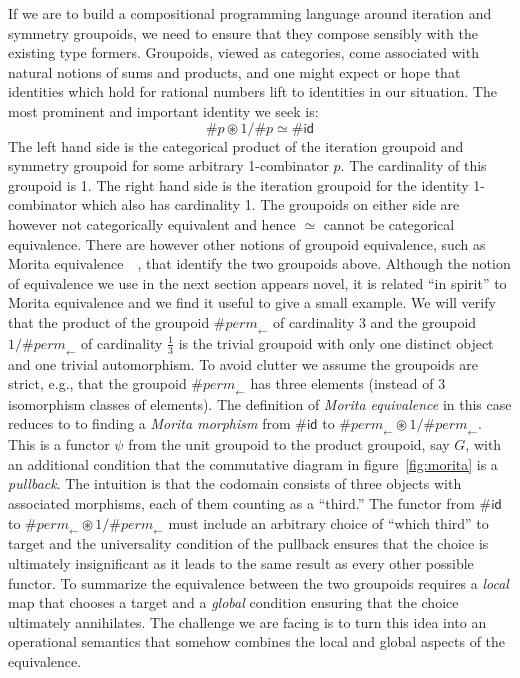 \documentclass[a4paper,USenglish]{lipics-v2016-utf8x}
\newcommand{\hash}{\#}
\newcommand{\order}[1]{\hash #1}
\newcommand{\iorder}[1]{1/\hash #1}
\newcommand{\permfive}{\mathit{perm}_{\leftarrow}}
\newcommand{\idiso}{\mathsf{{id}}}
\begin{document}
If we are to build a compositional programming language around iteration and
symmetry groupoids, we need to ensure that they compose sensibly with the
existing type formers. Groupoids, viewed as categories, come associated with
natural notions of sums and products, and one might expect or hope that
identities which hold for rational numbers lift to identities in our
situation. The most prominent and important identity we seek is:
\[
\order{p} \circledast \iorder{p} \simeq \order{\idiso}
\]
The left hand side is the categorical product of the iteration groupoid and
symmetry groupoid for some arbitrary 1-combinator $p$. The cardinality of this
groupoid is 1. The right hand side is the iteration groupoid for the identity
1-combinator which also has cardinality 1. The groupoids on either side are
however not categorically equivalent and hence $\simeq$ cannot be categorical
equivalence.  There are however other notions of groupoid equivalence, such as
Morita equivalence~\cite[C5.3]{johnstone2002sketches}~\cite{looping}, that
identify the two groupoids above.  Although the notion of equivalence we use in
the next section appears novel, it is related ``in spirit'' to Morita
equivalence and we find it useful to give a small example. We will verify that
the product of the groupoid $\order{\permfive}$ of cardinality 3 and the
groupoid $\iorder{\permfive}$ of cardinality $\frac{1}{3}$ is the trivial
groupoid with only one distinct object and one trivial automorphism. To avoid
clutter we assume the groupoids are strict, e.g., that the groupoid
$\order{\permfive}$ has three elements (instead of 3 isomorphism classes of
elements). The definition of \emph{Morita equivalence} in this case reduces to
to finding a \emph{Morita morphism} from $\order{\idiso}$ to
$\order{\permfive} \circledast \iorder{\permfive}$. This is a functor $\psi$
from the unit groupoid to the product groupoid, say $G$, with an additional
condition that the commutative diagram in figure~\ref{fig:morita} is a
\emph{pullback}. The intuition is that the codomain consists of three objects
with associated morphisms, each of them counting as a ``third.'' The functor
from $\order{\idiso}$ to $\order{\permfive} \circledast \iorder{\permfive}$ must
include an arbitrary choice of ``which third'' to target and the universality
condition of the pullback ensures that the choice is ultimately insignificant as
it leads to the same result as every other possible functor. To summarize the
equivalence between the two groupoids requires a \emph{local} map that chooses a
target and a \emph{global} condition ensuring that the choice ultimately
annihilates. The challenge we are facing is to turn this idea into an operational
semantics that somehow combines the local and global aspects of the equivalence.
\end{document}
